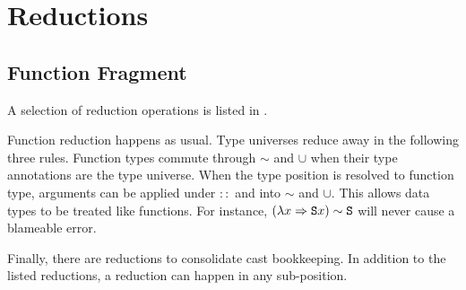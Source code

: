\section{Reductions}
 
\subsection{Function Fragment}
A selection of reduction operations is listed in .

Function reduction happens as usual.
Type universes reduce away in the following three rules.
Function types commute through $\sim$ and $\cup$ when their type annotations are the type universe.
When the type position is resolved to function type, arguments can be applied under $::$ and into $\sim$ and $\cup$.
This allows data types to be treated like functions.
For instance, $(\lambda x \Rightarrow\mathtt{S}{} x) \sim \mathtt{S}{}$ will never cause a blameable error.
 
Finally, there are reductions to consolidate cast bookkeeping.
In addition to the listed reductions, a reduction can happen in any sub-position.



